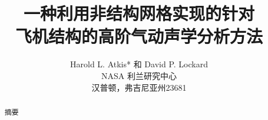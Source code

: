 \documentclass[twocolumn]{article}
\begin{document}

\title{一种利用非结构网格实现的针对\\飞机结构的高阶气动声学分析方法}
\author{Harold L. Atkis* 和 David P. Lockard\\NASA 利兰研究中心\\汉普顿，弗吉尼亚州23681}
\date{}

\maketitle

\begin{abstract}

摘要

\end{abstract}


\section*{}

\end{document}
